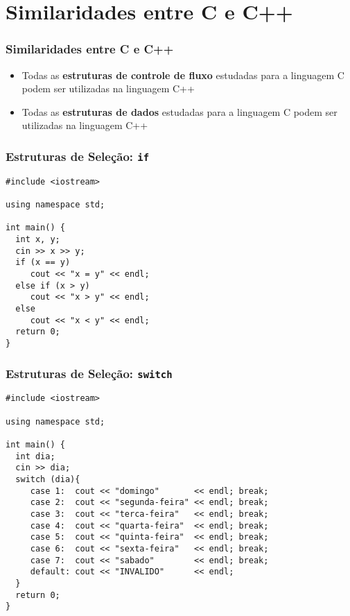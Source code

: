 \documentclass[aspectratio=169]{beamer}
\begin{document}
\section{Similaridades entre C e C++}

\begin{frame}\frametitle{Similaridades entre C e C++}
\begin{itemize}
	\item Todas as \textbf{estruturas de controle de fluxo} estudadas para a linguagem C podem ser utilizadas na linguagem C++
	\item Todas as \textbf{estruturas de dados} estudadas para a linguagem C podem ser utilizadas na linguagem C++
\end{itemize}
\end{frame}

\begin{frame}[fragile]\frametitle{Estruturas de Seleção: \texttt{if}}
\begin{lstlisting}
#include <iostream>

using namespace std;

int main() {
  int x, y;
  cin >> x >> y;
  if (x == y)
     cout << "x = y" << endl;
  else if (x > y)
     cout << "x > y" << endl;
  else
     cout << "x < y" << endl;
  return 0;
}
\end{lstlisting}
\end{frame}

\begin{frame}[fragile]\frametitle{Estruturas de Seleção: \texttt{switch}}
\begin{lstlisting}[basicstyle=\ttfamily\scriptsize]
#include <iostream>

using namespace std;

int main() {
  int dia;
  cin >> dia;
  switch (dia){
     case 1:  cout << "domingo"       << endl; break;
     case 2:  cout << "segunda-feira" << endl; break;
     case 3:  cout << "terca-feira"   << endl; break;
     case 4:  cout << "quarta-feira"  << endl; break;
     case 5:  cout << "quinta-feira"  << endl; break;
     case 6:  cout << "sexta-feira"   << endl; break;
     case 7:  cout << "sabado"        << endl; break;
     default: cout << "INVALIDO"      << endl;
  }
  return 0;
}
\end{lstlisting}
\end{frame}
\end{document}
